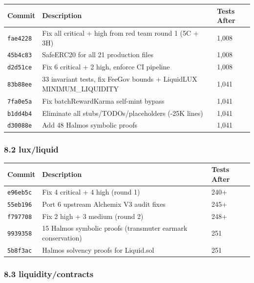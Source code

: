 \documentclass[
]{article}
\newcounter{none} %
\begin{document}
{\def\LTcaptype{none} %
\begin{longtable}[]{@{}lll@{}}
\toprule\noalign{}
Commit & Description & Tests After \\
\midrule\noalign{}
\endhead
\bottomrule\noalign{}
\endlastfoot
\texttt{fae4228} & Fix all critical + high from red team round 1 (5C +
3H) & 1,008 \\
\texttt{45b4c83} & SafeERC20 for all 21 production files & 1,008 \\
\texttt{d2d51ce} & Fix 6 critical + 2 high, enforce CI pipeline &
1,008 \\
\texttt{83b88ee} & 33 invariant tests, fix FeeGov bounds + LiquidLUX
MINIMUM\_LIQUIDITY & 1,041 \\
\texttt{7fa0e5a} & Fix batchRewardKarma self-mint bypass & 1,041 \\
\texttt{b1dd4b4} & Eliminate all stubs/TODOs/placeholders (-25K lines) &
1,041 \\
\texttt{d30088e} & Add 48 Halmos symbolic proofs & 1,041 \\
\end{longtable}
}

\subsubsection{8.2 lux/liquid}\label{82-luxliquid}

{\def\LTcaptype{none} %
\begin{longtable}[]{@{}lll@{}}
\toprule\noalign{}
Commit & Description & Tests After \\
\midrule\noalign{}
\endhead
\bottomrule\noalign{}
\endlastfoot
\texttt{e96eb5c} & Fix 4 critical + 4 high (round 1) & 240+ \\
\texttt{55eb196} & Port 6 upstream Alchemix V3 audit fixes & 245+ \\
\texttt{f797708} & Fix 2 high + 3 medium (round 2) & 248+ \\
\texttt{9939358} & 15 Halmos symbolic proofs (transmuter earmark
conservation) & 251 \\
\texttt{5b8f3ac} & Halmos solvency proofs for Liquid.sol & 251 \\
\end{longtable}
}

\subsubsection{8.3 liquidity/contracts}\label{83-liquiditycontracts}
\end{document}
